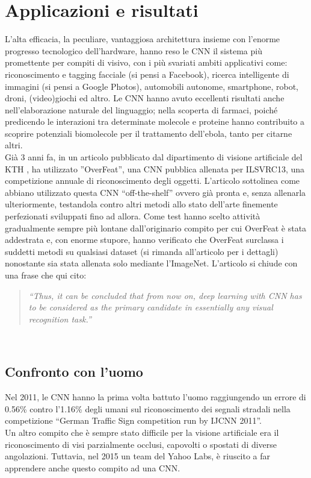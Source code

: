 \section{Applicazioni e risultati}
L'alta efficacia, la peculiare, vantaggiosa architettura insieme con l'enorme progresso tecnologico dell'hardware, hanno reso le CNN il sistema più promettente per compiti di visivo, con i più svariati ambiti applicativi come: riconoscimento e tagging facciale (si pensi a Facebook), ricerca intelligente di immagini (si pensi a Google Photos), automobili autonome, smartphone, robot, droni, (video)giochi ed altro. Le CNN hanno avuto eccellenti risultati anche nell'elaborazione naturale del linguaggio; nella scoperta di farmaci, poiché predicendo le interazioni tra determinate molecole e proteine hanno contribuito a scoprire potenziali biomolecole per il trattamento dell'ebola\parencite{WCNN}, tanto per citarne altri.\\
Già 3 anni fa, in un articolo pubblicato dal dipartimento di visione artificiale del KTH \parencite{Overfeat}, ha utilizzato ”OverFeat”, una CNN pubblica allenata per ILSVRC13, una competizione annuale di riconoscimento degli oggetti. L'articolo sottolinea come abbiano utilizzato questa CNN “off-the-shelf” ovvero già pronta e, senza allenarla ulteriormente, testandola contro altri metodi allo stato dell'arte finemente perfezionati sviluppati fino ad allora. Come test hanno scelto attività gradualmente sempre più lontane dall'originario compito per cui OverFeat è stata addestrata e, con enorme stupore, hanno verificato che OverFeat surclassa i suddetti metodi su qualsiasi dataset (si rimanda all'articolo per i dettagli) nonostante sia stata allenata solo mediante l'ImageNet. L'articolo si chiude con una frase che qui cito:
\begin{quote}
\emph{“Thus, it can be concluded that from now on, deep learning with CNN has to be considered as the primary candidate in essentially any visual recognition task.”}
\end{quote}\\
\subsection{Confronto con l'uomo}
Nel 2011, le CNN hanno la prima volta battuto l’uomo raggiungendo un errore di 0.56\% contro l’1.16\% degli umani sul riconoscimento dei segnali stradali nella competizione “German Traffic Sign competition run by IJCNN 2011”.\\
Un altro compito che è sempre stato difficile per la visione artificiale era il riconoscimento di visi parzialmente occlusi, capovolti o spostati di diverse angolazioni. Tuttavia, nel 2015 un team del Yahoo Labs, è riuscito a far apprendere anche questo compito ad una CNN\parencite{WMit}.

